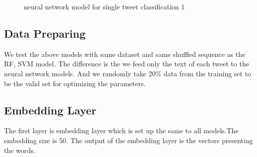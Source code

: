 \begin{figure}[]
{}
\caption{neural network model for single tweet classification 1}
\label{fig:NNModel1}
\end{figure}



  \subsection{Data Preparing} %
We test the above models with same dataset and same shuffled sequence as the RF, SVM model. The difference is the we feed only the text of each tweet to the neural network models. And we randomly take 20\% data from the training set to be the valid set for optimizing the parameters. 
 \subsection{Embedding Layer}  
 The first layer is embedding layer which is set up the same to all models.The embedding size is 50. The output of the embedding layer is the vectors presenting the words.  
